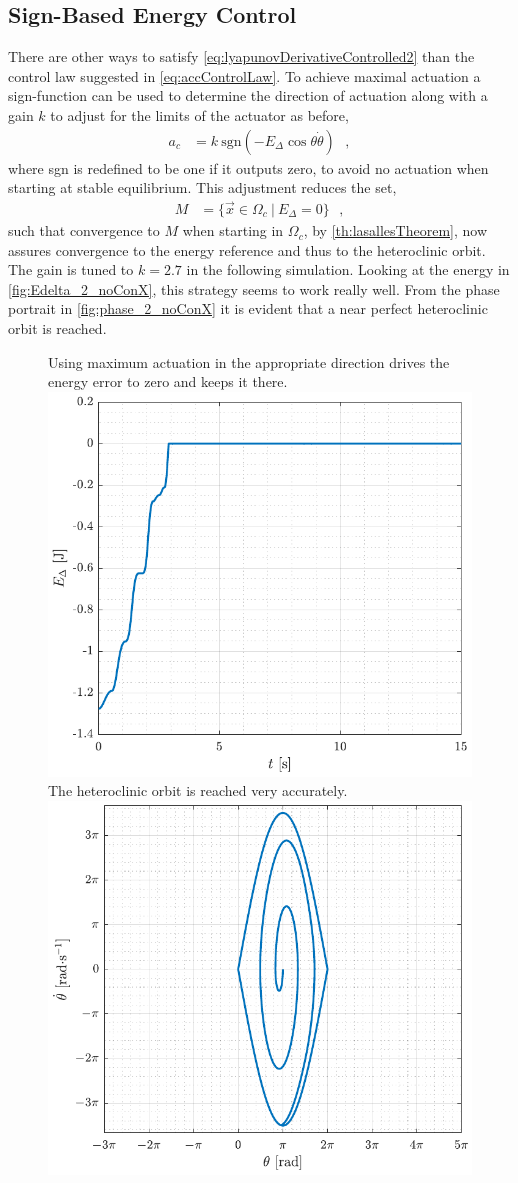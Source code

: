 \subsection{Sign-Based Energy Control}
There are other ways to satisfy \autoref{eq:lyapunovDerivativeControlled2} than the control law suggested in \autoref{eq:accControlLaw}. To achieve maximal actuation a sign-function can be used to determine the direction of actuation along with a gain $k$ to adjust for the limits of the actuator as before,
\begin{align}
  a_c &= k\ \mathrm{sgn}(-E_\Delta \cos \theta \dot{\theta})  \ \ \ ,  \label{eq:accControlLaw2} 
\end{align}
where sgn is redefined to be one if it outputs zero, to avoid no actuation when starting at stable equilibrium. This adjustment reduces the set,
\begin{align}
  M  &= \{ \vec{x} \in \Omega_c \ | \ E_\Delta = 0 \}  \ \ \ ,  \label{eq:M2}
\end{align}
such that convergence to $M$ when starting in $\Omega_c$, by \autoref{th:lasallesTheorem}, now assures convergence to the energy reference and thus to the heteroclinic orbit.\\
The gain is tuned to $k = 2.7$ in the following simulation. Looking at the energy in \autoref{fig:Edelta_2_noConX}, this strategy seems to work really well. From the phase portrait in \autoref{fig:phase_2_noConX} it is evident that a near perfect heteroclinic orbit is reached.
\begin{figure}[H]
  \hspace{-10pt}
  \captionbox
  {
    Using maximum actuation in the appropriate direction drives the energy error to zero and keeps it there.
    \label{fig:Edelta_2_noConX}
  }
  {
    \hspace{-1cm}
    \includegraphics[width=.453\textwidth]{figures/Edelta_2_noConX}
  }
  \hspace{20pt}
  \captionbox 
  {
    The heteroclinic orbit is reached very accurately.
    \label{fig:phase_2_noConX}
  }
  {
    \hspace{-1cm}
    \includegraphics[width=.46\textwidth]{figures/phase_2_noConX}
  }  
\end{figure}
